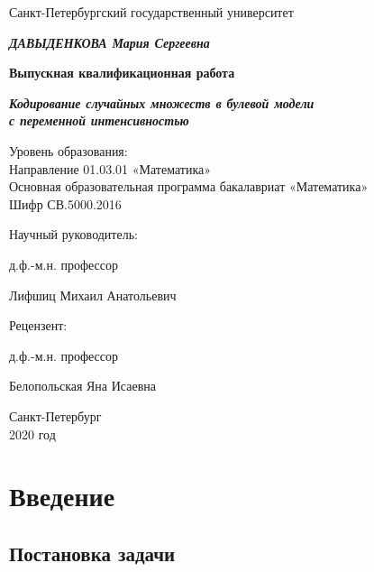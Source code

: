 \documentclass[12pt]{article}
\theoremstyle{plain}
\theoremstyle{definition}
\theoremstyle{remark}
\begin{document}
\thispagestyle{empty}%

\centerline{Санкт-Петербургский государственный университет}

\vspace{2.5cm}

\begin{center}
  \textbf{\textit{ДАВЫДЕНКОВА Мария Сергеевна}}
  \bigskip
  
\textbf{Выпускная квалификационная работа}
\bigskip

\textbf{\textit{Кодирование случайных множеств в булевой модели\\ с переменной интенсивностью}}
\end{center}

\vspace{1.3cm}

\begin{center}
    Уровень образования:\\
Направление 01.03.01 «Математика»\\
Основная образовательная программа бакалавриат «Математика» \\
Шифр СВ.5000.2016
\end{center}

\vspace{3cm}

{\parindent=9.2cm 
	Научный руководитель: \par
	д.ф.-м.н. профессор \par
	Лифшиц Михаил Анатольевич \par} 
	
\vspace{1.3cm}
{\parindent=9.2cm 
	Рецензент: \par
	д.ф.-м.н. профессор \par
	Белопольская Яна Исаевна \par}

\vspace{3cm}
\begin{center}
	Санкт-Петербург \\
	2020 год
\end{center}

\tableofcontents

\section{Введение}
\subsection{Постановка задачи}
\end{document}
